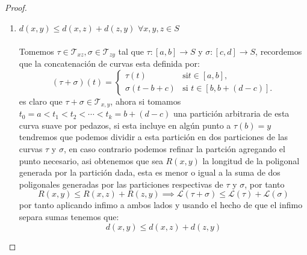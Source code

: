 \documentclass[11pt,letterpaper]{article}
\begin{document}
\begin{proof}
\begin{enumerate}
    \newpage
    \item $d(x,y)\leq d(x,z)+d(z,y)\,\,\forall x,y,z\in S$\,\\
    \,\\
    Tomemos $ \tau\in \mathcal{T}_{xz},\sigma\in \mathcal{T}_{zy}$ tal que $\tau:[a,b]\to S$ y $\sigma:[c,d]\to S$, recordemos que la concatenaci\'on de curvas esta definida por:
    \[
(\tau+\sigma)(t) =
\begin{cases}
\tau(t)& \text{si} t\in[a,b], \\
\sigma(t-b+c) & \text{si } t\in[b,b+(d-c)].
\end{cases}
\]
es claro que $\tau+\sigma\in \mathcal{T}_{x,y}$, ahora si tomamos $t_0=a<t_1<t_2<\cdots<t_k=b+(d-c)$ una partici\'on arbitraria de esta curva suave por pedazos, si esta incluye en alg\'un punto a $\tau(b)=y$ tendremos que podemos dividir a esta partici\'on en dos particiones de las curvas $\tau$ y $\sigma$, en caso contrario podemos refinar la partci\'on agregando el punto necesario, asi obtenemos que
sea $R(x,y)$ la longitud de la poligonal generada por la partici\'on dada, esta es menor o igual a la suma de dos poligonales generadas por las particiones respectivas de $\tau$ y $\sigma$, por tanto\,\\
\begin{equation*}
    R(x,y)\leq R(x,z)+R(z,y)\implies \mathcal{L}(\tau+\sigma)\leq \mathcal{L}(\tau)+\mathcal{L}(\sigma)
\end{equation*}
por tanto aplicando infimo a ambos lados y usando el hecho de que el infimo separa sumas tenemos que:\,\\
\begin{equation*}
    d(x,y)\leq d(x,z)+d(z,y)
\end{equation*}
\end{enumerate}
\end{proof}
\end{document}

